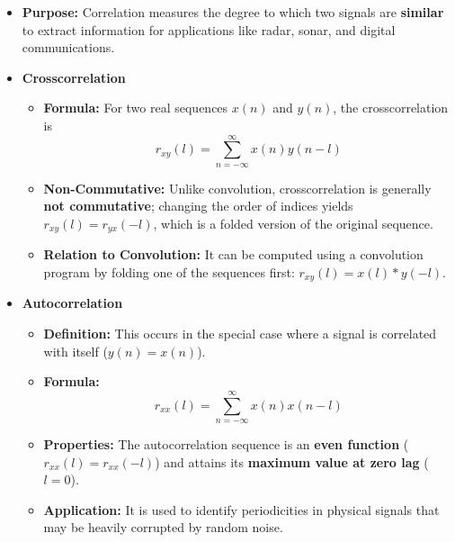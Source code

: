 \begin{itemize}
\tightlist
\item
  \textbf{Purpose:} Correlation measures the degree to which two signals
  are \textbf{similar} to extract information for applications like
  radar, sonar, and digital communications.
\item
  \textbf{Crosscorrelation}

  \begin{itemize}
  \tightlist
  \item
    \textbf{Formula:} For two real sequences \(x(n)\) and \(y(n)\), the
    crosscorrelation is
    \[r_{xy}(l) = \sum_{n=-\infty}^{\infty} x(n)y(n-l)\]
  \item
    \textbf{Non-Commutative:} Unlike convolution, crosscorrelation is
    generally \textbf{not commutative}; changing the order of indices
    yields \(r_{xy}(l) = r_{yx}(-l)\), which is a folded version of the
    original sequence.
  \item
    \textbf{Relation to Convolution:} It can be computed using a
    convolution program by folding one of the sequences first:
    \(r_{xy}(l) = x(l) * y(-l)\).
  \end{itemize}
\item
  \textbf{Autocorrelation}

  \begin{itemize}
  \tightlist
  \item
    \textbf{Definition:} This occurs in the special case where a signal
    is correlated with itself (\(y(n) = x(n)\)).
  \item
    \textbf{Formula:}
    \[r_{xx}(l) = \sum_{n=-\infty}^{\infty} x(n)x(n-l)\]
  \item
    \textbf{Properties:} The autocorrelation sequence is an \textbf{even
    function} (\(r_{xx}(l) = r_{xx}(-l)\)) and attains its
    \textbf{maximum value at zero lag} (\(l=0\)).
  \item
    \textbf{Application:} It is used to identify periodicities in
    physical signals that may be heavily corrupted by random noise.
  \end{itemize}
\end{itemize}

